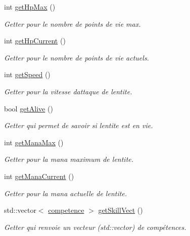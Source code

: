 \begin{DoxyCompactItemize}
int \hyperlink{classentite_ab8e6c4dd900884cba5bec025f1e55999}{get\+Hp\+Max} ()
\begin{DoxyCompactList}\small\item\em Getter pour le nombre de points de vie max. \end{DoxyCompactList}\item 
int \hyperlink{classentite_ae41fa12581d2f94d5f6ae67fec4e56e9}{get\+Hp\+Current} ()
\begin{DoxyCompactList}\small\item\em Getter pour le nombre de points de vie actuels. \end{DoxyCompactList}\item 
int \hyperlink{classentite_ab97281eadee20e03fe497396439260c9}{get\+Speed} ()
\begin{DoxyCompactList}\small\item\em Getter pour la vitesse d\textquotesingle{}attaque de l\textquotesingle{}entite. \end{DoxyCompactList}\item 
bool \hyperlink{classentite_a5a39811eb0c12ae85a23f152c8ba6d58}{get\+Alive} ()
\begin{DoxyCompactList}\small\item\em Getter qui permet de savoir si l\textquotesingle{}entite est en vie. \end{DoxyCompactList}\item 
int \hyperlink{classentite_a427218420d74bdec1f79f93572ecf24a}{get\+Mana\+Max} ()
\begin{DoxyCompactList}\small\item\em Getter pour la mana maximum de l\textquotesingle{}entite. \end{DoxyCompactList}\item 
int \hyperlink{classentite_ad3e7a419d79d7d7e836243c4920703e3}{get\+Mana\+Current} ()
\begin{DoxyCompactList}\small\item\em Getter pour la mana actuelle de l\textquotesingle{}entite. \end{DoxyCompactList}\item 
std\+::vector$<$ \hyperlink{classcompetence}{competence} $>$ \hyperlink{classentite_a90c927665d7c0b7d6d5202604887e1e2}{get\+Skill\+Vect} ()
\begin{DoxyCompactList}\small\item\em Getter qui renvoie un vecteur (std\+::vector) de compétences. \end{DoxyCompactList}\item 

\end{DoxyCompactItemize}
